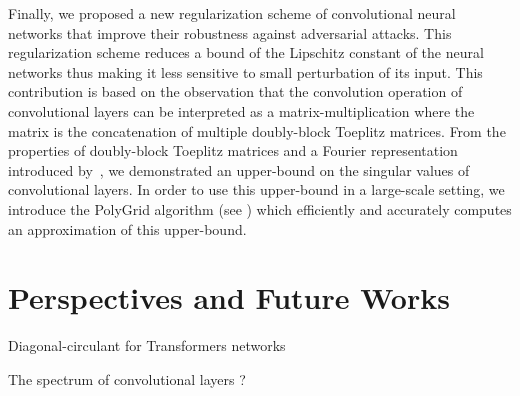 Finally, we proposed a new regularization scheme of convolutional neural networks that improve their robustness against adversarial attacks.
This regularization scheme reduces a bound of the Lipschitz constant of the neural networks thus making it less sensitive to small perturbation of its input.
This contribution is based on the observation that the convolution operation of convolutional layers can be interpreted as a matrix-multiplication where the matrix is the concatenation of multiple doubly-block Toeplitz matrices.
From the properties of doubly-block Toeplitz matrices and a Fourier representation introduced by~\citet{grenander1958toeplitz}, we demonstrated an upper-bound on the singular values of convolutional layers.
In order to use this upper-bound in a large-scale setting, we introduce the PolyGrid algorithm (see ) which efficiently and accurately computes an approximation of this upper-bound.





%
%
%
%
%
%
%
%

\section{Perspectives and Future Works}
\label{section:ch6-perspectives_and_future_works}



Diagonal-circulant for Transformers networks

The spectrum of convolutional layers ? 




